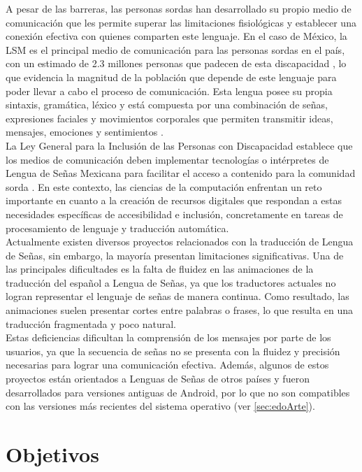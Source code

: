 A pesar de las barreras, las personas sordas han desarrollado su propio medio de comunicación que les permite superar las limitaciones fisiológicas y establecer una conexión efectiva con quienes comparten este lenguaje. En el caso de México, la LSM es el principal medio de comunicación para las personas sordas en el país, con un estimado de 2.3 millones personas que padecen de esta discapacidad \cite{ref3}, lo que evidencia la magnitud de la población que depende de este lenguaje para poder llevar a cabo el proceso de comunicación. Esta lengua posee su propia sintaxis, gramática, léxico y está compuesta por una combinación de señas, expresiones faciales y movimientos corporales que permiten transmitir ideas, mensajes, emociones y sentimientos \cite{ref4}.\\

La Ley General para la Inclusión de las Personas con Discapacidad establece que los medios de comunicación deben implementar tecnologías o intérpretes de Lengua de Señas Mexicana para facilitar el acceso a contenido para la comunidad sorda \cite{ref4}. En este contexto, las ciencias de la computación enfrentan un reto importante en cuanto a la creación de recursos digitales que respondan a estas necesidades específicas de accesibilidad e inclusión, concretamente en tareas de procesamiento de lenguaje y traducción automática.\\

Actualmente existen diversos proyectos relacionados con la traducción de Lengua de Señas, sin embargo, la mayoría presentan limitaciones significativas. Una de las principales dificultades es la falta de fluidez en las animaciones de la traducción del español a Lengua de Señas, ya que los traductores actuales no logran representar el lenguaje de señas de manera continua. Como resultado, las animaciones suelen presentar cortes entre palabras o frases, lo que resulta en una traducción fragmentada y poco natural.\\

Estas deficiencias dificultan la comprensión de los mensajes por parte de los usuarios, ya que la secuencia de señas no se presenta con la fluidez y precisión necesarias para lograr una comunicación efectiva. Además, algunos de estos proyectos están orientados a Lenguas de Señas de otros países y fueron desarrollados para versiones antiguas de Android, por lo que no son compatibles con las versiones más recientes del sistema operativo (ver \autoref{sec:edoArte}).

\section{Objetivos}
